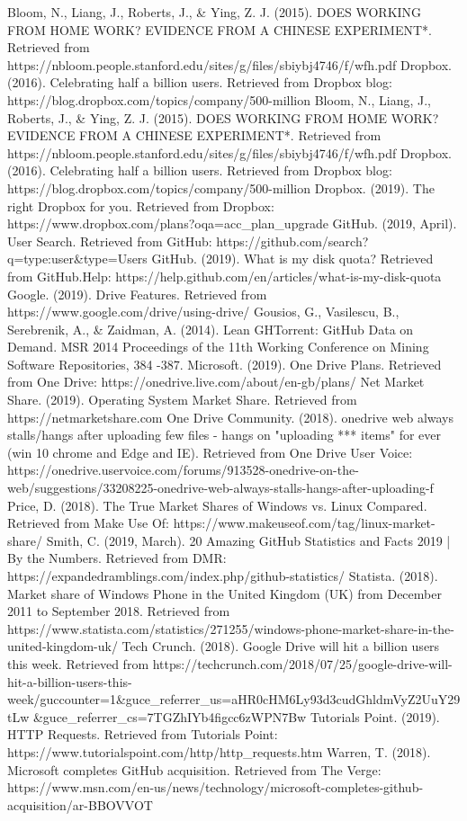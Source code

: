 \documentclass[11pt]{article}
\begin{document}
\begin{thebibliography}{9}
Bloom, N., Liang, J., Roberts, J., \& Ying, Z. J. (2015). DOES WORKING FROM HOME WORK? EVIDENCE FROM A CHINESE EXPERIMENT*. Retrieved from https://nbloom.people.stanford.edu/sites/g/files/sbiybj4746/f/wfh.pdf
Dropbox. (2016). Celebrating half a billion users. Retrieved from Dropbox blog: https://blog.dropbox.com/topics/company/500-million
Bloom, N., Liang, J., Roberts, J., \& Ying, Z. J. (2015). DOES WORKING FROM HOME WORK? EVIDENCE FROM A CHINESE EXPERIMENT*. Retrieved from https://nbloom.people.stanford.edu/sites/g/files/sbiybj4746/f/wfh.pdf
Dropbox. (2016). Celebrating half a billion users. Retrieved from Dropbox blog: https://blog.dropbox.com/topics/company/500-million
Dropbox. (2019). The right Dropbox for you. Retrieved from Dropbox: https://www.dropbox.com/plans?oqa=acc\_plan\_upgrade
GitHub. (2019, April). User Search. Retrieved from GitHub: https://github.com/search?q=type:user\&type=Users
GitHub. (2019). What is my disk quota? Retrieved from GitHub.Help: https://help.github.com/en/articles/what-is-my-disk-quota
Google. (2019). Drive Features. Retrieved from https://www.google.com/drive/using-drive/
Gousios, G., Vasilescu, B., Serebrenik, A., \& Zaidman, A. (2014). Lean GHTorrent: GitHub Data on Demand. MSR 2014 Proceedings of the 11th Working Conference on Mining Software Repositories, 384 -387.
Microsoft. (2019). One Drive Plans. Retrieved from One Drive: https://onedrive.live.com/about/en-gb/plans/
Net Market Share. (2019). Operating System Market Share. Retrieved from https://netmarketshare.com
One Drive Community. (2018). onedrive web always stalls/hangs after uploading few files - hangs on "uploading *** items" for ever (win 10 chrome and Edge and IE). Retrieved from One Drive User Voice:
https://onedrive.uservoice.com/forums/913528-onedrive-on-the-web/suggestions/33208225-onedrive-web-always-stalls-hangs-after-uploading-f
Price, D. (2018). The True Market Shares of Windows vs. Linux Compared. Retrieved from Make Use Of: https://www.makeuseof.com/tag/linux-market-share/
Smith, C. (2019, March). 20 Amazing GitHub Statistics and Facts 2019 | By the Numbers. Retrieved from DMR:
https://expandedramblings.com/index.php/github-statistics/
Statista. (2018). Market share of Windows Phone in the United Kingdom (UK) from December 2011 to September 2018. Retrieved from https://www.statista.com/statistics/271255/windows-phone-market-share-in-the-united-kingdom-uk/
Tech Crunch. (2018). Google Drive will hit a billion users this week. Retrieved from https://techcrunch.com/2018/07/25/google-drive-will-hit-a-billion-users-this-week/guccounter=1\&guce\_referrer\_us=aHR0cHM6Ly93d3cudGhldmVyZ2UuY29tLw 
 \&guce\_referrer\_cs=7TGZhIYb4figcc6zWPN7Bw
Tutorials Point. (2019). HTTP Requests. Retrieved from Tutorials Point: https://www.tutorialspoint.com/http/http\_requests.htm
Warren, T. (2018). Microsoft completes GitHub acquisition. Retrieved from The Verge: https://www.msn.com/en-us/news/technology/microsoft-completes-github-acquisition/ar-BBOVVOT


\end{thebibliography}
\end{document}
